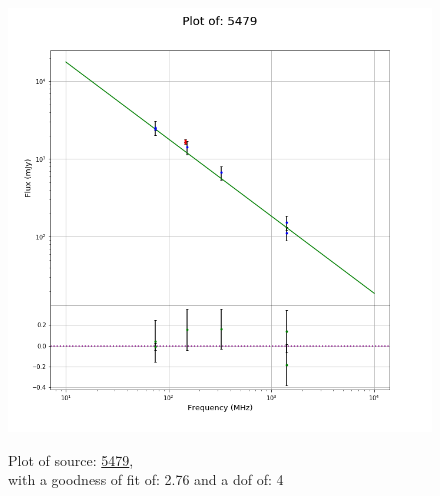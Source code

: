 \documentclass{article}
\begin{document}
\begin{figure}[H]
\begin{minipage}{0.5\textwidth}
        \includegraphics[scale = 0.35]{KmeulenSimSource_1hr/1hr5479.png}
        \captionsetup{labelformat=empty}
        \caption{Plot of source: \href{http://banana.transientskp.org/r4/vlo_KmeulenSimSource/runningcatalog/5479}{5479},\\with a goodness of fit of: 2.76 and a dof of: 4}
    \addtocounter{figure}{-1}
    \label{KmeulenSimSource:1hr:5479:plot}
    \end{minipage}
\end{figure}
\newpage
\end{document}
